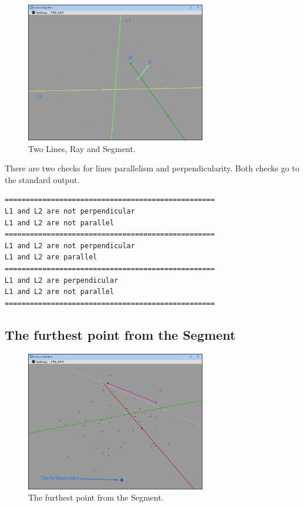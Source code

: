 \documentclass[12pt,a4paper,english]{article}
\begin{document}
\begin{figure}[H]
    \centering
    \includegraphics[width=0.7\textwidth]{p2a-2}
    \caption[]{Two Lines, Ray and Segment.}
    \label{fig:p2a-2}
\end{figure}

There are two checks for lines parallelism and perpendicularity. Both checks go to the standard output.

\begin{verbatim}
==================================================
L1 and L2 are not perpendicular
L1 and L2 are not parallel
==================================================
L1 and L2 are not perpendicular
L1 and L2 are parallel
==================================================
L1 and L2 are perpendicular
L1 and L2 are not parallel
==================================================
\end{verbatim}

\subsection{The furthest point from the Segment}

\begin{figure}[H]
    \centering
    \includegraphics[width=0.7\textwidth]{p2a-3}
    \caption[]{The furthest point from the Segment.}
    \label{fig:p2a-3}
\end{figure}
\end{document}

